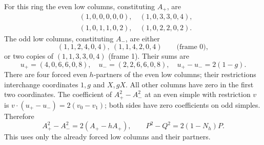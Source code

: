 For this ring the even low columns, constituting $A_+$, are
\[
 \begin{split}
 &(1,0,0,0,0,0),\quad(1,0,3,3,0,4),\\
 &(1,0,1,1,0,2),\quad(1,0,2,2,0,2).
 \end{split}
\]
The odd low columns, constituting $A_-$, are either
\[
 (1,1,2,4,0,4),\ (1,1,4,2,0,4) \qquad\text{(frame 0)},
\]
or two copies of $(1,1,3,3,0,4)$ (frame 1). Their sums are
\[
 u_+=(4,0,6,6,0,8),\quad u_-=(2,2,6,6,0,8),
 \quad u_+-u_-=2(1-g).
\]
There are four forced even $h$-partners of the even low columns; their restrictions interchange coordinates $1,g$ and $X,gX$. All other columns have zero in the first two coordinates. The coefficient of $A_+^2-A_-^2$ at an even simple with restriction $v$ is $v\cdot(u_+-u_-)=2(v_0-v_1)$; both sides have zero coefficients on odd simples. Therefore
\begin{equation}\label{refined:eq:square}
 A_+^2-A_-^2=2(A_+-hA_+),\qquad
 P^2-Q^2=2(1-N_h)P.
\end{equation}
This uses only the already forced low columns and their partners.

